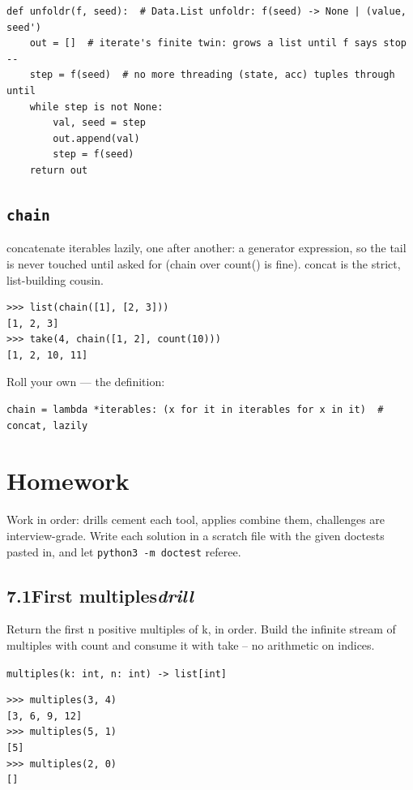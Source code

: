 \documentclass[10pt,letterpaper]{book}
\begin{document}
\begin{lstlisting}[style=ex]
def unfoldr(f, seed):  # Data.List unfoldr: f(seed) -> None | (value, seed')
    out = []  # iterate's finite twin: grows a list until f says stop --
    step = f(seed)  # no more threading (state, acc) tuples through until
    while step is not None:
        val, seed = step
        out.append(val)
        step = f(seed)
    return out
\end{lstlisting}

\subsection{\texttt{chain}}\label{def:chain}
concatenate iterables lazily, one after another: a generator expression, so the tail is never touched until asked for (chain over count() is fine). concat is the strict, list-building cousin.
\begin{lstlisting}[style=ex]
>>> list(chain([1], [2, 3]))
[1, 2, 3]
>>> take(4, chain([1, 2], count(10)))
[1, 2, 10, 11]
\end{lstlisting}

Roll your own --- the definition:

\begin{lstlisting}[style=ex]
chain = lambda *iterables: (x for it in iterables for x in it)  # concat, lazily
\end{lstlisting}

\section{Homework}
Work in order: drills cement each tool, applies combine them,
challenges are interview-grade. Write each solution in a scratch file with
the given doctests pasted in, and let \texttt{python3 -m doctest} referee.
\subsection*{7.1\quad First multiples\hfill\textnormal{\textit{drill}}}
Return the first n positive multiples of k, in order. Build the infinite stream of multiples with count and consume it with take -- no arithmetic on indices.

\noindent\texttt{multiples(k: int, n: int) -> list[int]}
\begin{lstlisting}[style=ex]
>>> multiples(3, 4)
[3, 6, 9, 12]
>>> multiples(5, 1)
[5]
>>> multiples(2, 0)
[]
\end{lstlisting}
\end{document}
